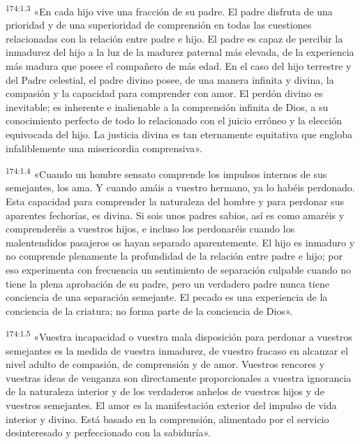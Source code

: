 \par
\textsuperscript{174:1.3} «En cada hijo vive una fracción de su padre. El padre disfruta de una prioridad y de una superioridad de comprensión en todas las cuestiones relacionadas con la relación entre padre e hijo. El padre es capaz de percibir la inmadurez del hijo a la luz de la madurez paternal más elevada, de la experiencia más madura que posee el compañero de más edad. En el caso del hijo terrestre y del Padre celestial, el padre divino posee, de una manera infinita y divina, la compasión y la capacidad para comprender con amor. El perdón divino es inevitable; es inherente e inalienable a la comprensión infinita de Dios, a su conocimiento perfecto de todo lo relacionado con el juicio erróneo y la elección equivocada del hijo. La justicia divina es tan eternamente equitativa que engloba infaliblemente una misericordia comprensiva».

\par
\textsuperscript{174:1.4} «Cuando un hombre sensato comprende los impulsos internos de sus semejantes, los ama. Y cuando amáis a vuestro hermano, ya lo habéis perdonado. Esta capacidad para comprender la naturaleza del hombre y para perdonar sus aparentes fechorías, es divina. Si sois unos padres sabios, así es como amaréis y comprenderéis a vuestros hijos, e incluso los perdonaréis cuando los malentendidos pasajeros os hayan separado aparentemente. El hijo es inmaduro y no comprende plenamente la profundidad de la relación entre padre e hijo; por eso experimenta con frecuencia un sentimiento de separación culpable cuando no tiene la plena aprobación de su padre, pero un verdadero padre nunca tiene conciencia de una separación semejante. El pecado es una experiencia de la conciencia de la criatura; no forma parte de la conciencia de Dios».

\par
\textsuperscript{174:1.5} «Vuestra incapacidad o vuestra mala disposición para perdonar a vuestros semejantes es la medida de vuestra inmadurez, de vuestro fracaso en alcanzar el nivel adulto de compasión, de comprensión y de amor. Vuestros rencores y vuestras ideas de venganza son directamente proporcionales a vuestra ignorancia de la naturaleza interior y de los verdaderos anhelos de vuestros hijos y de vuestros semejantes. El amor es la manifestación exterior del impulso de vida interior y divino. Está basado en la comprensión, alimentado por el servicio desinteresado y perfeccionado con la sabiduría».

